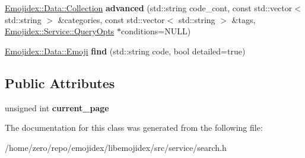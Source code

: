\begin{DoxyCompactItemize}
\item 
\hyperlink{classEmojidex_1_1Data_1_1Collection}{Emojidex\+::\+Data\+::\+Collection} {\bfseries advanced} (std\+::string code\+\_\+cont, const std\+::vector$<$ std\+::string $>$ \&categories, const std\+::vector$<$ std\+::string $>$ \&tags, \hyperlink{classEmojidex_1_1Service_1_1QueryOpts}{Emojidex\+::\+Service\+::\+Query\+Opts} $\ast$conditions=N\+U\+LL)\hypertarget{classEmojidex_1_1Service_1_1Search_a2924585a8bb92c1b902477cabc154fb0}{}\label{classEmojidex_1_1Service_1_1Search_a2924585a8bb92c1b902477cabc154fb0}

\item 
\hyperlink{classEmojidex_1_1Data_1_1Emoji}{Emojidex\+::\+Data\+::\+Emoji} {\bfseries find} (std\+::string code, bool detailed=true)\hypertarget{classEmojidex_1_1Service_1_1Search_a80970b4a18e5bcc37a2a697de237e8aa}{}\label{classEmojidex_1_1Service_1_1Search_a80970b4a18e5bcc37a2a697de237e8aa}

\end{DoxyCompactItemize}
\subsection*{Public Attributes}
\begin{DoxyCompactItemize}
\item 
unsigned int {\bfseries current\+\_\+page}\hypertarget{classEmojidex_1_1Service_1_1Search_a8fe41d03f8c3013a021ad103c2ab4245}{}\label{classEmojidex_1_1Service_1_1Search_a8fe41d03f8c3013a021ad103c2ab4245}

\end{DoxyCompactItemize}


The documentation for this class was generated from the following file\+:\begin{DoxyCompactItemize}
\item 
/home/zero/repo/emojidex/libemojidex/src/service/search.\+h\end{DoxyCompactItemize}
